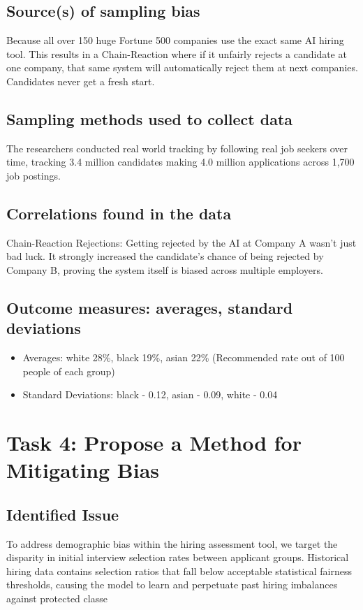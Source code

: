 \documentclass[
	letterpaper, %
]{jdf}
\begin{document}
\subsection{Source(s) of sampling bias}
Because all over 150 huge Fortune 500 companies use the exact same AI hiring tool. This results in a Chain-Reaction where if it unfairly rejects a candidate at one company, that same system will automatically reject them at next companies. Candidates never get a fresh start.

\subsection{Sampling methods used to collect data}
The researchers conducted real world tracking by following real job seekers over time, tracking 3.4 million candidates making 4.0 million applications across 1,700 job postings.

\subsection{Correlations found in the data}
Chain-Reaction Rejections: Getting rejected by the AI at Company A wasn't just bad luck. It strongly increased the candidate's chance of being rejected by Company B, proving the system itself is biased across multiple employers.

\subsection{Outcome measures: averages, standard deviations}
\begin{itemize}
    \item Averages: white 28\%, black 19\%, asian 22\% (Recommended rate out of 100 people of each group)
    \item Standard Deviations: black - 0.12, asian - 0.09, white - 0.04
\end{itemize}

\section{Task 4: Propose a Method for Mitigating Bias}
\subsection{Identified Issue}
To address demographic bias within the hiring assessment tool, we target the disparity in initial interview selection rates between applicant groups. Historical hiring data contains selection ratios that fall below acceptable statistical fairness thresholds, causing the model to learn and perpetuate past hiring imbalances against protected classe
\end{document}
